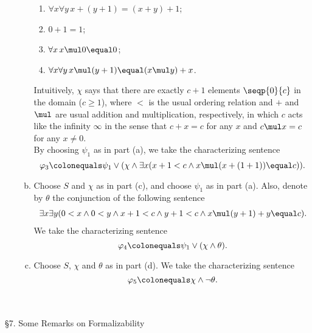 \begin{enumerate}[1.]
\begin{enumerate}[(a)]
\begin{enumerate}[(1)]
\item $\forall x \forall y \, x + (y + 1) \equal (x + y) + 1$;
\item $0 + 1 \equal 1$;
\item $\forall x \, x \mul 0 \equal 0$;
\item $\forall x \forall y \, x \mul (y + 1) \equal (x \mul y) + x$.
\end{enumerate}
Intuitively, $\chi$ says that there are exactly $c + 1$ elements $\seqp{0}{c}$ in the domain ($c \geq 1$), where $<$ is the usual ordering relation and $+$ and $\mul$ are usual addition and multiplication, respectively, in which $c$ acts like the infinity $\infty$ in the sense that $c + x = c$ for any $x$ and $c \mul x = c$ for any $x \neq 0$.\medskip\\
By choosing $\psi_1$ as in part (a), we take the characterizing sentence
\[
\varphi_3 \colonequals \psi_1 \lor (\chi \land \exists x (x + 1 < c \land x \mul (x + (1 + 1)) \equal c)).
\]
\item Choose $S$ and $\chi$ as in part (c), and choose $\psi_1$ as in part (a).
Also, denote by $\theta$ the conjunction of the following sentence
\[
\begin{array}{l}
\exists x \exists y (0 < x \land 0 < y \land x + 1 < c \land y + 1 < c \land x \mul (y + 1) + y \equal c).
\end{array}
\]
We take the characterizing sentence
\[
\varphi_4 \colonequals \psi_1 \lor (\chi \land \theta).
\]
\item Choose $S$, $\chi$ and $\theta$ as in part (d). We take the characterizing sentence
\[
\varphi_5 \colonequals \chi \land \neg\theta.
\]
\end{enumerate}
\end{enumerate}
\ 
\\
\\
{\large \S7. Some Remarks on Formalizability}
